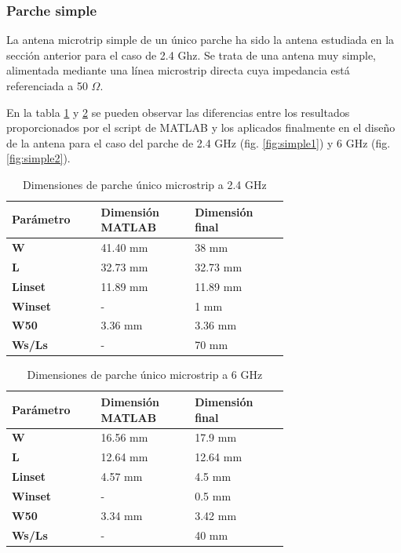 \subsubsection{Parche simple} 
\par La antena microtrip simple de un único parche ha sido la antena estudiada en la sección anterior para el caso de 2.4 Ghz. Se trata de una antena muy simple, alimentada mediante una línea microstrip directa cuya impedancia está referenciada a 50 $\Omega$.
\\
\par En la tabla \ref{tab:simple1} y \ref{tab:simple2} se pueden observar las diferencias entre los resultados proporcionados por el script de MATLAB y los aplicados finalmente en el diseño de la antena para el caso del parche de 2.4 GHz (fig. \ref{fig:simple1}) y 6 GHz (fig. \ref{fig:simple2}).

\begin{table}[H]
  
   
   \small %
   \centering %
   \begin{tabular}{m{0.2\linewidth}m{0.25\linewidth}m{0.25\linewidth}} %
   \toprule[\heavyrulewidth]\toprule[\heavyrulewidth]
   \textbf{Parámetro} & \textbf{Dimensión MATLAB} & \textbf{Dimensión final} \\ 
   \midrule
   \textbf{W} & 41.40 mm & 38 mm \\
   \textbf{L} & 32.73 mm & 32.73 mm\\
   \textbf{Linset} & 11.89 mm & 11.89 mm\\
   \textbf{Winset} & - & 1 mm\\
   \textbf{W50} & 3.36 mm & 3.36 mm\\
   \textbf{Ws/Ls} & - & 70 mm\\
   \bottomrule[\heavyrulewidth] 
   \end{tabular}
   \caption{Dimensiones de parche único microstrip a 2.4 GHz} 
   \label{tab:simple1}
\end{table}

\begin{table}[H]
  
   
   \small %
   \centering %
   \begin{tabular}{m{0.2\linewidth}m{0.25\linewidth}m{0.25\linewidth}} %
   \toprule[\heavyrulewidth]\toprule[\heavyrulewidth]
   \textbf{Parámetro} & \textbf{Dimensión MATLAB} & \textbf{Dimensión final} \\ 
   \midrule
   \textbf{W} & 16.56 mm & 17.9 mm \\
   \textbf{L} & 12.64 mm & 12.64 mm\\
   \textbf{Linset} & 4.57 mm & 4.5 mm\\
   \textbf{Winset} & - & 0.5 mm\\
   \textbf{W50} & 3.34 mm & 3.42 mm\\
   \textbf{Ws/Ls} & - & 40 mm\\
   \bottomrule[\heavyrulewidth] 
   \end{tabular}
   \caption{Dimensiones de parche único microstrip a 6 GHz} 
   \label{tab:simple2}
\end{table}

